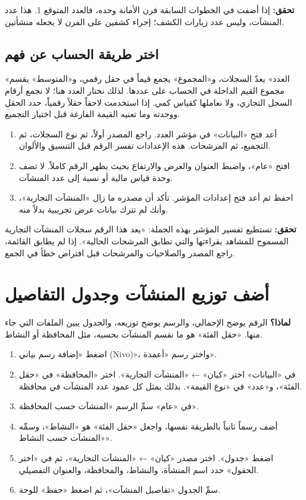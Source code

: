\textbf{تحقق:} إذا أضفت في الخطوات السابقة فرن الأمانة وحده، فالعدد المتوقع 1. هذا عدد المنشآت، وليس عدد زيارات الكشف؛ إجراء كشفين على الفرن لا يجعله منشأتين.

\subsection{اختر طريقة الحساب عن فهم}

«العدد» يعدّ السجلات، و«المجموع» يجمع قيماً في حقل رقمي، و«المتوسط» يقسم مجموع القيم الداخلة في الحساب على عددها. لذلك نختار العدد هنا؛ لا نجمع أرقام السجل التجاري، ولا نعاملها كقياس كمي. إذا استخدمت لاحقاً حقلاً رقمياً، حدد الحقل ووحدته وما تعنيه القيمة الفارغة قبل اختيار التجميع.

\begin{enumerate}
\item أعد فتح «البيانات» في مؤشر العدد. راجع المصدر أولاً، ثم نوع السجلات، ثم التجميع، ثم المرشحات. هذه الإعدادات تفسر الرقم قبل التنسيق والألوان.
\item افتح «عام»، واضبط العنوان والعرض والارتفاع بحيث يظهر الرقم كاملاً. لا تضف وحدة قياس مالية أو نسبة إلى عدد المنشآت.
\item احفظ ثم أعد فتح إعدادات المؤشر. تأكد أن مصدره ما زال «المنشآت التجارية»، وأنك لم تترك بيانات عرض تجريبية بدلاً منه.
\end{enumerate}

\textbf{تحقق:} تستطيع تفسير المؤشر بهذه الجملة: «يعد هذا الرقم سجلات المنشآت التجارية المسموح للمشاهد بقراءتها والتي تطابق المرشحات الحالية». إذا لم يطابق القائمة، راجع المصدر والصلاحيات والمرشحات قبل افتراض خطأ في الجمع.

\section{أضف توزيع المنشآت وجدول التفاصيل}
\label{sec:build-charts}

\textbf{لماذا؟} الرقم يوضح الإجمالي، والرسم يوضح توزيعه، والجدول يبين الملفات التي جاء منها. «حقل الفئة» هو ما نقسم المنشآت بحسبه، مثل المحافظة أو النشاط.

\begin{enumerate}
\item اضغط «إضافة رسم بياني (Nivo)»، واختر رسم «أعمدة».
\item في «البيانات» اختر «كيان» ← «المنشآت التجارية». اختر «المحافظة» في «حقل الفئة»، و«عدد» في «نوع القيمة». بذلك يمثل كل عمود عدد المنشآت في محافظة.
\item في «عام» سمِّ الرسم «المنشآت حسب المحافظة».
\item أضف رسماً ثانياً بالطريقة نفسها، واجعل «حقل الفئة» هو «النشاط»، وسمِّه «المنشآت حسب النشاط».
\item اضغط «جدول». اختر مصدر «كيان» ← «المنشآت التجارية»، ثم في «اختر الحقول» حدد اسم المنشأة، والنشاط، والمحافظة، والعنوان التفصيلي.
\item سمِّ الجدول «تفاصيل المنشآت»، ثم اضغط «حفظ» للوحة.
\end{enumerate}

